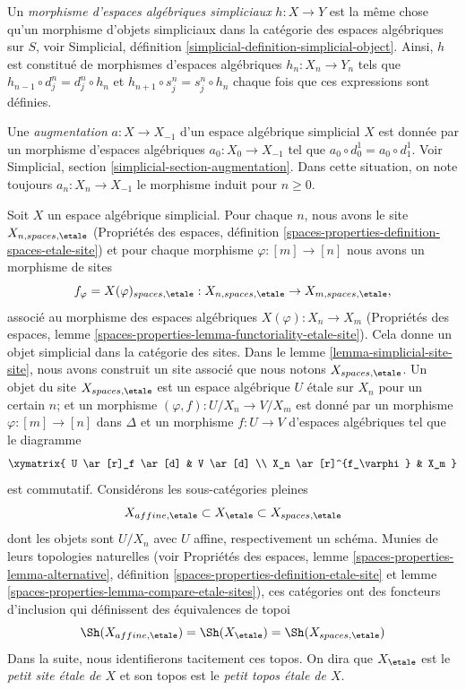 \medskip\noindent
Un {\it morphisme d'espaces algébriques simpliciaux} $h : X \to Y$ est la même
chose qu'un morphisme d'objets simpliciaux dans
la catégorie des espaces algébriques sur $S$,
voir Simplicial, définition \ref{simplicial-definition-simplicial-object}.
Ainsi, $h$ est constitué de morphismes d'espaces algébriques $h_n : X_n \to Y_n$
tels que $h_{n - 1} \circ d^n_j = d^n_j \circ h_n$ et
$h_{n + 1} \circ s^n_j = s^n_j \circ h_n$ chaque fois que ces expressions sont définies.

\medskip\noindent
Une {\it augmentation} $a : X \to X_{-1}$
d'un espace algébrique simplicial $X$ est donnée par un morphisme
d'espaces algébriques $a_0 : X_0 \to X_{-1}$
tel que $a_0 \circ d^1_0 = a_0 \circ d^1_1$.
Voir Simplicial, section \ref{simplicial-section-augmentation}.
Dans cette situation, on note toujours $a_n : X_n \to X_{-1}$ le morphisme induit
pour $n \geq 0$.

\medskip\noindent
Soit $X$ un espace algébrique simplicial. Pour chaque $n$, nous avons le site
$X_{n, spaces, \etale}$ (Propriétés des espaces, définition
\ref{spaces-properties-definition-spaces-etale-site})
et pour chaque morphisme $\varphi : [m] \to [n]$ nous avons un morphisme de sites
$$
f_\varphi = X(\varphi)_{spaces, \etale} :
X_{n, spaces, \etale} \to X_{m, spaces, \etale},
$$
associé au morphisme des espaces algébriques
$X(\varphi) : X_n \to X_m$ (Propriétés des espaces, lemme
\ref{spaces-properties-lemma-functoriality-etale-site}).
Cela donne un objet simplicial dans la catégorie des sites.
Dans le lemme \ref{lemma-simplicial-site-site}, nous avons construit un site
associé que nous notons $X_{spaces, \etale}$.
Un objet du site $X_{spaces, \etale}$ est
un espace algébrique $U$ \'etale sur $X_n$ pour un certain $n$;
et un morphisme $(\varphi, f) : U/X_n \to V/X_m$ est donné
par un morphisme $\varphi : [m] \to [n]$ dans $\Delta$ et un morphisme
$f : U \to V$ d'espaces algébriques tel que le diagramme
$$
\xymatrix{
U \ar[r]_f \ar[d] & V \ar[d] \\
X_n \ar[r]^{f_\varphi} & X_m
}
$$
est commutatif. Considérons les sous-catégories pleines
$$
X_{affine, \etale} \subset X_\etale \subset X_{spaces, \etale}
$$
dont les objets sont $U/X_n$ avec $U$ affine, respectivement un schéma.
Munies de leurs topologies naturelles
(voir
Propriétés des espaces, lemme \ref{spaces-properties-lemma-alternative},
définition \ref{spaces-properties-definition-etale-site} et
lemme \ref{spaces-properties-lemma-compare-etale-sites}),
ces catégories ont des foncteurs d'inclusion qui définissent des équivalences de topoi
$$
\Sh(X_{affine, \etale}) = \Sh(X_\etale) = \Sh(X_{spaces, \etale})
$$
Dans la suite, nous identifierons tacitement ces topos.
On dira que $X_\etale$ est le {\it petit site \'etale de $X$}
et son topos est le {\it petit topos \'etale de $X$}.

